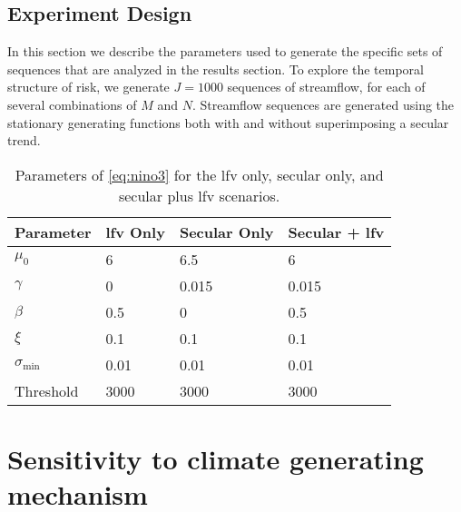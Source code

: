 \documentclass[
  draft,
  linenumbers
]{agujournal2018}
\begin{document}
\subsection{Experiment Design}\label{sec:methods-experiments}

In this section we describe the parameters used to generate the specific sets of sequences that are analyzed in the results section.
To explore the temporal structure of risk, we generate $J=1000$ sequences of streamflow, for each of several combinations of $M$ and $N$.
Streamflow sequences are generated using the stationary generating functions both with and without superimposing a secular trend.

\begin{table}[ht]
  \centering
  \begin{tabular}{llll}
    \toprule
    Parameter & \gls{lfv} Only & Secular Only & Secular + \gls{lfv} \\
    \midrule
    $\mu_0$             & 6     & 6.5   & 6 \\
    $\gamma$            & 0     & 0.015 & 0.015\\
    $\beta$             & 0.5   & 0     & 0.5\\
    $\xi$               & 0.1   & 0.1   & 0.1\\
    $\sigma_\text{min}$ & 0.01  & 0.01  & 0.01\\
    Threshold           & 3000  & 3000  & 3000 \\
    \bottomrule
  \end{tabular}
  \caption{
    Parameters of \cref{eq:nino3} for the \gls{lfv} only, secular only, and secular plus \gls{lfv} scenarios.
  }\label{tab:nino-stationary}
\end{table}

\section{Sensitivity to climate generating mechanism}\label{sec:markov-generating}
\end{document}
